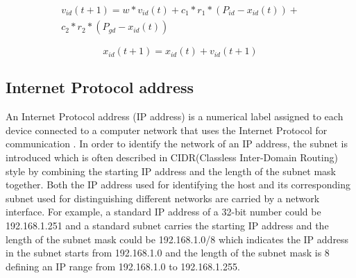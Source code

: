 \documentclass[conference]{IEEEtran}
\begin{document}
\begin{equation}\label{eq:UpdateV}
	\begin{aligned}
	v_{id}(t+1) = w * v_{id}(t) + c_{1} * r_{1} * (P_{id} - x_{id}(t)) + \\
	c_{2} * r_{2} * (P_{gd} - x_{id}(t))
	\end{aligned}
\end{equation}

\begin{equation}\label{eq:UpdateX}
	x_{id}(t+1) = x_{id}(t) + v_{id}(t+1)
\end{equation}

\subsection{Internet Protocol address}

An Internet Protocol address (IP address) is a numerical label assigned to each device connected to a computer network that uses the Internet Protocol for communication \cite{IP:Postel}. In order to identify the network of an IP address, the subnet is introduced which is often described in CIDR(Classless Inter-Domain Routing) style \cite{CIDR:Fuller} by combining the starting IP address and the length of the subnet mask together. Both the IP address used for identifying the host and its corresponding subnet used for distinguishing different networks are carried by a network interface. For example, a standard IP address of a 32-bit number could be 192.168.1.251 and a standard subnet carries the starting IP address and the length of the subnet mask could be 192.168.1.0/8 which indicates the IP address in the subnet starts from 192.168.1.0 and the length of the subnet mask is 8 defining an IP range from 192.168.1.0 to 192.168.1.255. 

%
\end{document}
